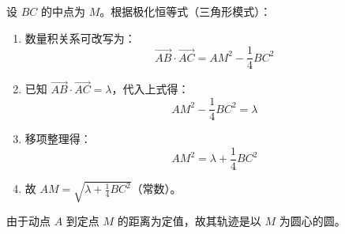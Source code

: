 \begin{proofbox}
设 $BC$ 的中点为 $M$。根据极化恒等式（三角形模式）：
\begin{enumerate}
    \item 数量积关系可改写为：
    \[ \vec{AB} \cdot \vec{AC} = AM^2 - \frac{1}{4}BC^2 \]
    \item 已知 $\vec{AB} \cdot \vec{AC} = \lambda$，代入上式得：
    \[ AM^2 - \frac{1}{4}BC^2 = \lambda \]
    \item 移项整理得：
    \[ AM^2 = \lambda + \frac{1}{4}BC^2 \]
    \item 故 $AM = \sqrt{\lambda + \frac{1}{4}BC^2}$（常数）。
\end{enumerate}
由于动点 $A$ 到定点 $M$ 的距离为定值，故其轨迹是以 $M$ 为圆心的圆。
\end{proofbox}